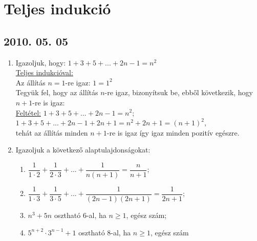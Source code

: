\documentclass{article}
\newenvironment{abc}{\begin{enumerate}[label=\textit{\alph*})]}{\end{enumerate}}
\begin{document}
\section*{Teljes indukció}
	
\subsection*{2010. 05. 05}
\begin{enumerate}
\item Igazoljuk, hogy: $1+3+5+...+2n-1=n^{2}$\\
\underline{Teljes indukcióval:}\\
Az állítás $n=1$-re igaz: $1=1^{2}$\\
Tegyük fel, hogy az állítás $n$-re igaz, bizonyítsuk be, ebből következik, hogy $n+1$-re is igaz:\\ 
\underline{Feltétel:}
$1+3+5+...+2n-1=n^{2}$;\\
$1+3+5+...+2n-1+2n+1=n ^{2}+2n+1=(n+1)^{2}$,\\ tehát az állítás minden $n+1$-re is igaz
így igaz minden pozitív egészre.
\item Igazoljuk a következő alaptulajdonságokat:
\begin{abc}
\item $\dfrac{1}{1\cdot2}+\dfrac{1}{2\cdot3}+...+\dfrac{1}{n(n+1)}=\dfrac{n}{n+1}$;
\item $\dfrac{1}{1\cdot3}+\dfrac{1}{3\cdot5}+...+\dfrac{1}{(2n-1)(2n+1)}=\dfrac{1}{2n+1}$;
\item $n^{3}+5n$ osztható 6-al, ha $n\ge1$, egész szám;
\item $5^{n+2}\cdot3^{n-1}+1$ osztható 8-al, ha $n\ge1$, egész szám
\end{abc}
\end{enumerate}
\end{document}
